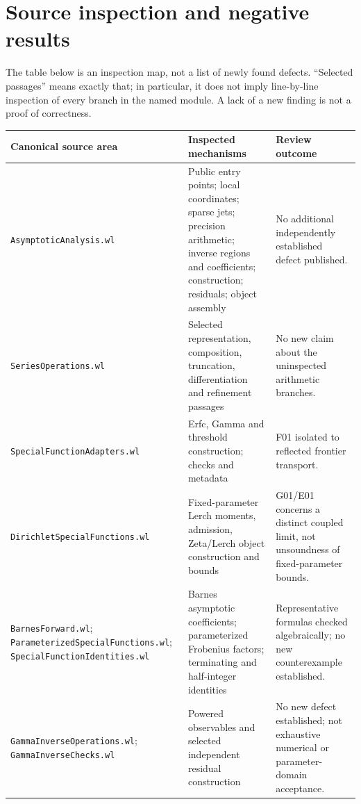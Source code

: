 \documentclass[11pt,a4paper]{article}
\begin{document}
\section{Source inspection and negative results}

The table below is an inspection map, not a list of newly found defects.
``Selected passages'' means exactly that; in particular, it does not imply
line-by-line inspection of every branch in the named module. A lack of a new
finding is not a proof of correctness.

\begin{longtable}{@{}>{\raggedright\arraybackslash}p{}>{\raggedright\arraybackslash}p{}>{\raggedright\arraybackslash}p{}@{}}
\toprule
Canonical source area & Inspected mechanisms & Review outcome\\
\midrule\endhead
\nolinkurl{AsymptoticAnalysis.wl} & Public entry points; local coordinates;
sparse jets; precision arithmetic; inverse regions and coefficients;
construction; residuals; object assembly & No additional independently
established defect published.\\[5pt]
\nolinkurl{SeriesOperations.wl} & Selected representation, composition,
truncation, differentiation and refinement passages & No new claim about the
uninspected arithmetic branches.\\[5pt]
\nolinkurl{SpecialFunctionAdapters.wl} & Erfc, Gamma and threshold construction;
checks and metadata & F01 isolated to reflected frontier transport.\\[5pt]
\nolinkurl{DirichletSpecialFunctions.wl} & Fixed-parameter Lerch moments, admission,
Zeta/Lerch object construction and bounds & G01/E01 concerns a distinct
coupled limit, not unsoundness of fixed-parameter bounds.\\[5pt]
\nolinkurl{BarnesForward.wl};\newline
\nolinkurl{ParameterizedSpecialFunctions.wl};\newline
\nolinkurl{SpecialFunctionIdentities.wl} & Barnes asymptotic coefficients;
parameterized Frobenius factors; terminating and half-integer identities &
Representative formulas checked algebraically; no new counterexample established.\\[5pt]
\nolinkurl{GammaInverseOperations.wl};\newline
\nolinkurl{GammaInverseChecks.wl} & Powered observables and selected independent
residual construction & No new defect established; not exhaustive numerical
or parameter-domain acceptance.\\[5pt]

\end{longtable}
\end{document}
